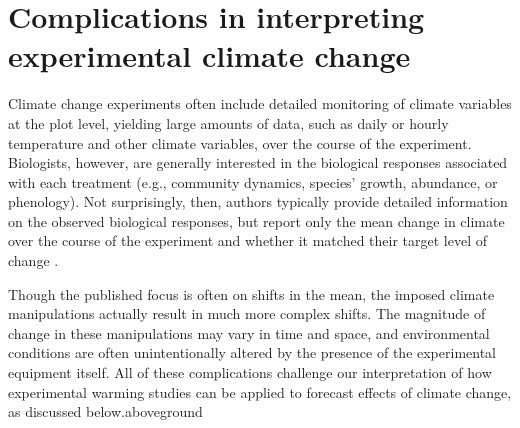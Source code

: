 \documentclass{article}
\begin{document}
\section* {Complications in interpreting experimental climate change} %
Climate change experiments often include detailed monitoring of climate variables at the plot level, yielding large amounts of data, such as daily or hourly temperature and other climate variables, over the course of the experiment. Biologists, however, are generally interested in the biological responses associated with each treatment (e.g., community dynamics, species' growth, abundance, or phenology). Not surprisingly, then, authors typically provide detailed information on the observed biological responses, but report only the mean change in climate over the course of the experiment and whether it matched their target level of change \citep[e.g.][]{price1998,clark2014a,clark2014b,rollinson2012}. 
\par Though the published focus is often on shifts in the mean, the imposed climate manipulations actually result in much more complex shifts. The magnitude of change in these manipulations may vary in time and space, and environmental conditions are often unintentionally altered by the presence of the experimental equipment itself. All of these complications challenge our interpretation of how experimental warming studies can be applied to forecast effects of climate change, as discussed below.aboveground
\end{document}
